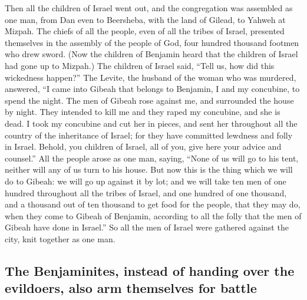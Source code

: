  Then all the children of Israel went out, and the
congregation was assembled as one man, from Dan even to Beersheba, with
the land of Gilead, to Yahweh at Mizpah.  The chiefs of
all the people, even of all the tribes of Israel, presented themselves
in the assembly of the people of God, four hundred thousand footmen who
drew sword.  (Now the children of Benjamin heard that the
children of Israel had gone up to Mizpah.) The children of Israel said,
``Tell us, how did this wickedness happen?''  The Levite,
the husband of the woman who was murdered, answered, ``I came into
Gibeah that belongs to Benjamin, I and my concubine, to spend the night.
 The men of Gibeah rose against me, and surrounded the
house by night. They intended to kill me and they raped my concubine,
and she is dead.  I took my concubine and cut her in
pieces, and sent her throughout all the country of the inheritance of
Israel; for they have committed lewdness and folly in Israel.
 Behold, you children of Israel, all of you, give here
your advice and counsel.''  All the people arose as one
man, saying, ``None of us will go to his tent, neither will any of us
turn to his house.  But now this is the thing which we
will do to Gibeah: we will go up against it by lot;  and
we will take ten men of one hundred throughout all the tribes of Israel,
and one hundred of one thousand, and a thousand out of ten thousand to
get food for the people, that they may do, when they come to Gibeah of
Benjamin, according to all the folly that the men of Gibeah have done in
Israel.''  So all the men of Israel were gathered against
the city, knit together as one man.

\hypertarget{the-benjaminites-instead-of-handing-over-the-evildoers-also-arm-themselves-for-battle}{%
\subsection{The Benjaminites, instead of handing over the evildoers,
also arm themselves for
battle}\label{the-benjaminites-instead-of-handing-over-the-evildoers-also-arm-themselves-for-battle}}


